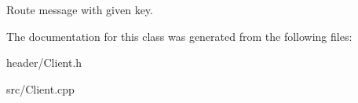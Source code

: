Route message with given key. 

The documentation for this class was generated from the following files\-:\begin{DoxyCompactItemize}
\item 
header/Client.\-h\item 
src/Client.\-cpp\end{DoxyCompactItemize}
